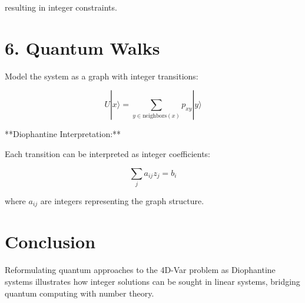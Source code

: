 \documentclass{article}
\begin{document}
resulting in integer constraints.

\section{6. Quantum Walks}

Model the system as a graph with integer transitions:

\[
U |x\rangle = \sum_{y \in \text{neighbors}(x)} p_{xy} |y\rangle
\]

**Diophantine Interpretation:**

Each transition can be interpreted as integer coefficients:

\[
\sum_{j} a_{ij} z_j = b_i
\]

where \( a_{ij} \) are integers representing the graph structure.

\section{Conclusion}

Reformulating quantum approaches to the 4D-Var problem as Diophantine systems illustrates how integer solutions can be sought in linear systems, bridging quantum computing with number theory.
\end{document}
